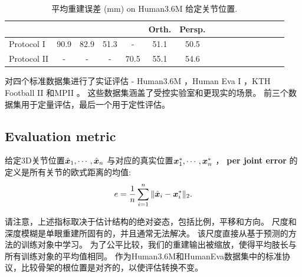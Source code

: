 
\begin{table}
\caption{平均重建误差 (mm) on Human3.6M \cite{ionescu2014human} 给定关节位置.}\label{tab:nrsfm}
\centering
\renewcommand{\arraystretch}{1.5}
\begin{tabular}{l*{15}{c}}
\toprule
 & \cite{ramakrishna2012reconstructing} &  \cite{dai2012simple} & \cite{zhou2015sparse} & \cite{yasin2016dual} & Orth. & Persp. \\
\toprule
Protocol I & 90.9 & 82.9 & 51.3 & - & 51.1 & 50.5 \\
Protocol II & - & - & - & 70.5 & 55.1 & 54.6 \\
\toprule
\end{tabular}
\end{table}

对四个标准数据集进行了实证评估 -  Human3.6M \cite{ionescu2014human}，Human Eva I \cite{sigal2010humaneva}，KTH Football II \cite{kazemi2013multi}和MPII \cite{andriluka14cvpr}。 这些数据集涵盖了受控实验室和更现实的场景。 前三个数据集用于定量评估，最后一个用于定性评估。
\subsection{Evaluation metric} %
\label{sub:evaluation_metric}

给定3D关节位置$\hat{{\bm{x}}}_1,\cdots,\hat{{\bm{x}}}_n$ 与对应的真实位置${\bm{x}}_1^*,\cdots,{\bm{x}}_n^*$ ， \textbf{per joint error} 的定义是所有关节的欧式距离的均值:
\begin{align}\label{eq:pje}
e = \frac{1}{n}\sum_{i=1}^n\|\hat{{\bm{x}}}_i-{\bm{x}}_i^*\|_2.
\end{align}

请注意，上述指标取决于估计结构的绝对姿态，包括比例，平移和方向。 尺度和深度模糊是单眼重建所固有的，并且通常无法解决。 该尺度直接从基于预测的方法的训练对象中学习\cite{ionescu2014human,li2015maximum,tekin2015predicting}。 为了公平比较，我们的重建输出被缩放，使得平均肢长与所有训练对象的平均值相同。 作为Human3.6M和HumanEva数据集中的标准协议，比较骨架的根位置是对齐的，以使评估转换不变。 %

